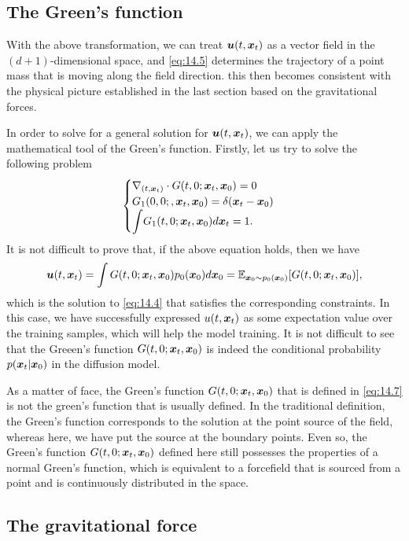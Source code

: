 \subsection{The Green's function}

With the above transformation, we can treat $\bm{u}(t,\bm{x}_{t})$ as a vector field in the $(d+1)$-dimensional space, and \cref{eq:14.5} determines the trajectory of a point mass that is moving along the field direction. this then becomes consistent with the physical picture established in the last section based on the gravitational forces.

In order to solve for a general solution for $\bm{u}(t,\bm{x}_{t})$, we can apply the mathematical tool of the Green's function. Firstly, let us try to solve the following problem
\begin{equation}\label{eq:14.7}
    \begin{cases}
        \nabla_{(t,\bm{x}_{t})}\cdot G(t,0;\bm{x}_{t},\bm{x}_0)=0\\
        G_{1}(0,0;,\bm{x}_{t},\bm{x}_0)=\delta(\bm{x}_{t}-\bm{x}_0)\\
        \displaystyle{\int}G_1(t,0;\bm{x}_{t},\bm{x}_0)d\bm{x}_{t}=1.
    \end{cases}
\end{equation}
It is not difficult to prove that, if the above equation holds, then we have
\begin{equation}
    \label{eq:14.8}
    \bm{u}(t,\bm{x}_{t})=\int G(t,0;\bm{x}_{t},\bm{x}_0)p_0(\bm{x}_0) d\bm{x}_0=\mathbb{E}_{\bm{x}_0\sim p_0 (\bm{x}_0)}[ G(t,0;\bm{x}_{t},\bm{x}_0)],
\end{equation}
which is the solution to \cref{eq:14.4} that satisfies the corresponding constraints. In this case, we have successfully expressed $u(t,\bm{x}_{t})$ as some expectation value over the training samples, which will help the model training. It is not difficult to see that the Greeen's function $G(t,0;\bm{x}_{t},\bm{x}_0)$ is indeed the conditional probability $p(\bm{x}_{t}|\bm{x}_0)$ in the diffusion model.

As a matter of face, the Green's function $G(t,0;\bm{x}_{t},\bm{x}_0)$ that is defined in \cref{eq:14.7} is not the green's function that is usually defined. In the traditional definition, the Green's function corresponds to the solution at the point source of the field, whereas here, we have put the source at the boundary points. Even so, the Green's function $G(t,0;\bm{x}_{t},\bm{x}_0)$ defined here still possesses the properties of a normal Green's function, which is equivalent to a forcefield that is sourced from a point and is continuously distributed in the space.

\subsection{The gravitational force}

